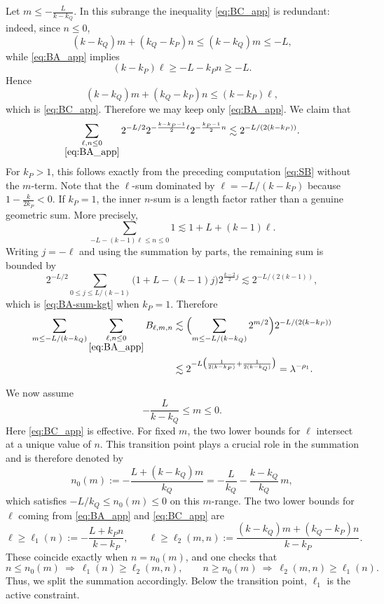 \documentclass[10pt]{amsart}
\numberwithin{equation}{section}
\theoremstyle{definition}
\theoremstyle{remark}
\theoremstyle{remark}
\begin{document}
	Let $m\le -\frac{L}{k-k_Q}$.
	In this subrange the inequality \eqref{eq:BC_app} is redundant: indeed, since $n\le 0$,
	\[
	(k-k_Q)m+(k_Q-k_P)n\le (k-k_Q)m\le -L,
	\]
	while \eqref{eq:BA_app} implies
	\[
	(k-k_P)\ell\ge -L-k_P n\ge -L.
	\]
	Hence
	\[
	(k-k_Q)m+(k_Q-k_P)n\le (k-k_P)\ell,
	\]
	which is \eqref{eq:BC_app}. Therefore we may keep only \eqref{eq:BA_app}. We claim that
	\begin{equation}\label{eq:BA-sum-kgt}
		\sum_{\substack{\ell,n\le0\\ \eqref{eq:BA_app}}}
		2^{-L/2}
		2^{-\frac{k-k_P-1}{2}\ell}
		2^{-\frac{k_P-1}{2}n}
		\lesssim
		2^{-L/(2(k-k_P))}.
	\end{equation}
	For \(k_P>1\), this follows exactly from the preceding computation \eqref{eq:SB} without the $m$-term. Note that the $\ell$-sum dominated by
	\(\ell=-L/(k-k_P)\) because \(1-\frac{k}{2k_P}<0\).
		If \(k_P=1\), the inner \(n\)-sum is a length factor rather than a genuine geometric sum.  More precisely,
		\[
		\sum_{-L-(k-1)\ell\le n\le0}1
		\lesssim
		1+L+(k-1)\ell.
		\]
		Writing \(j=-\ell\) and using the summation by parts, the remaining sum is bounded by
		\[
		2^{-L/2}\sum_{0\le j\le L/(k-1)}
		\bigl(1+L-(k-1)j\bigr)2^{\frac{k-2}{2}j}
		\lesssim
		2^{-L/(2(k-1))},
		\]
		which is \eqref{eq:BA-sum-kgt} when \(k_P=1\).
	Therefore
	\begin{align*}
		\sum_{m\le -L/(k-k_Q)}
		\sum_{\substack{\ell,n\le 0\\ \eqref{eq:BA_app}}}
		B_{\ell,m,n}
		&\lesssim
		\Bigl(\sum_{m\le -L/(k-k_Q)}2^{m/2}\Bigr)
		2^{-L/(2(k-k_P))}\\
		&\lesssim
		2^{-L\bigl(\frac1{2(k-k_P)}+\frac1{2(k-k_Q)}\bigr)}
		=
		\lambda^{-\rho_1}.
	\end{align*}
	
	We now assume
	\[
	-\frac{L}{k-k_Q}\le m\le 0.
	\]
	Here \eqref{eq:BC_app} is effective. 
    For fixed $m$,
    the two lower bounds for $\ell$ intersect at a unique value of $n$.
    This transition point plays a crucial role in the summation and is therefore denoted by
	\begin{equation*}
		n_0(m):=-\frac{L+(k-k_Q)m}{k_Q}
		=-\frac{L}{k_Q}-\frac{k-k_Q}{k_Q}\,m,
	\end{equation*}
	which satisfies $-L/k_Q\le n_0(m)\le 0$ on this $m$-range. The two lower bounds for $\ell$ coming from
	\eqref{eq:BA_app} and \eqref{eq:BC_app} are
	\[
	\ell\ge \ell_1(n):=-\frac{L+k_P n}{k-k_P},
	\qquad
	\ell\ge \ell_2(m,n):=
	\frac{(k-k_Q)m+(k_Q-k_P)n}{k-k_P}.
	\]
	These coincide exactly when $n=n_0(m)$, and one checks that
	\[
	n\le n_0(m)\ \Longrightarrow\ \ell_1(n)\ge \ell_2(m,n),
	\qquad
	n\ge n_0(m)\ \Longrightarrow\ \ell_2(m,n)\ge \ell_1(n).
	\]
	Thus, we split the summation accordingly.
	Below the transition point, $\ell_1$ is the active constraint.
\end{document}
